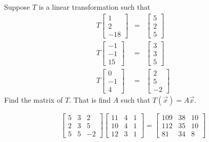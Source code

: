 \documentclass{ximera}
\begin{document}
\begin{problem}\label{prb:10.71} Suppose $T$ is a linear transformation such that
\begin{eqnarray*}
T\left[
\begin{array}{r}
1 \\
2 \\
-18
\end{array}
\right] &=&\left[
\begin{array}{r}
5 \\
2 \\
5
\end{array}
\right] \\
T\left[
\begin{array}{r}
-1 \\
-1 \\
15
\end{array}
\right] &=&\left[
\begin{array}{r}
3 \\
3 \\
5
\end{array}
\right] \\
T\left[
\begin{array}{r}
0 \\
-1 \\
4
\end{array}
\right] &=&\left[
\begin{array}{r}
2 \\
5 \\
-2
\end{array}
\right]
\end{eqnarray*}
Find the matrix of $T$. That is find $A$ such that $T(\vec{x})=A\vec{x}$. \vspace{1mm}
\begin{hint}
\[
\left[
\begin{array}{rrr}
5 & 3 & 2 \\
2 & 3 & 5 \\
5 & 5 & -2
\end{array}
\right] \left[
\begin{array}{ccc}
11 & 4 & 1 \\
10 & 4 & 1 \\
12 & 3 & 1
\end{array}
\right] =\left[
\begin{array}{ccc}
109 & 38 & 10 \\
112 & 35 & 10 \\
81 & 34 & 8
\end{array}
\right]
\]
\end{hint}
\end{problem}
\end{document}
